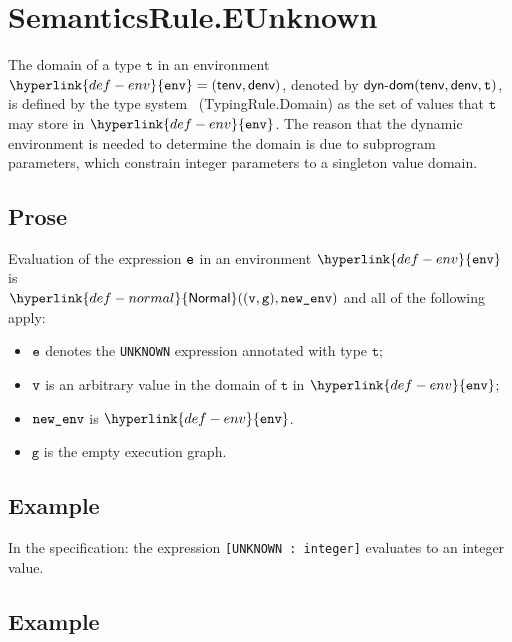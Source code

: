 \documentclass{book}
\newcommand\Normal[0]{\hyperlink{def-normal}{\textsf{Normal}}}
\newcommand\env[0]{\hyperlink{def-env}{\texttt{env}}}
\newcommand\vg[0]{\texttt{g}}
\newcommand\vt[0]{\texttt{t}}
\begin{document}

\section{SemanticsRule.EUnknown \label{sec:SemanticsRule.EUnknown}}
  \begin{definition}
  The domain of a type $\vt$ in an environment $\env=(\tenv,\denv)$,
  denoted by $\textsf{dyn-dom}(\tenv, \denv, \vt)$, is defined by the type system~\cite{ASLTypingReference}
  (TypingRule.Domain)
  as the set of values that $\vt$ may store in $\env$. The reason that the dynamic environment is
  needed to determine the domain is due to subprogram parameters, which constrain integer parameters to
  a singleton value domain.
  \end{definition}

  \subsection{Prose}
  Evaluation of the expression $\texttt{e}$ in an environment $\env$ is \\
  $\Normal((\vv, \vg), \newenv)$ and all of the following apply:
  \begin{itemize}
  \item $\texttt{e}$ denotes the \texttt{UNKNOWN} expression annotated with type $\vt$;
  \item $\texttt{v}$ is an arbitrary value in the domain of $\vt$ in $\env$;
  \item $\texttt{new\_env}$ is $\env$.
  \item $\vg$ is the empty execution graph.
  \end{itemize}

  \subsection{Example}
    In the specification:
    the expression \texttt{[UNKNOWN : integer]} evaluates to an integer value.

  \subsection{Example}
\end{document}
